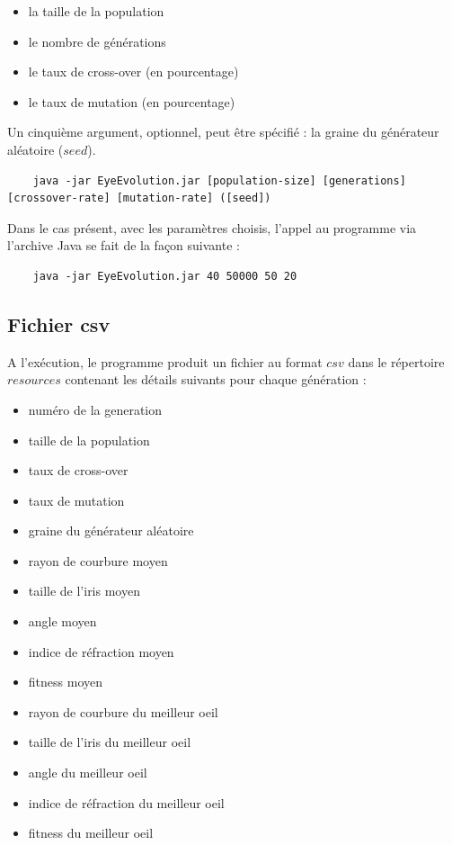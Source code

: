 \documentclass[a4paper,11pt]{article}
\begin{document}
\begin{itemize}
\item la taille de la population
\item le nombre de générations
\item le taux de cross-over (en pourcentage)
\item le taux de mutation (en pourcentage)
\end{itemize}

Un cinquième argument, optionnel, peut être spécifié : la graine du générateur aléatoire ($seed$).

\begin{lstlisting}
	java -jar EyeEvolution.jar [population-size] [generations] [crossover-rate] [mutation-rate] ([seed])
\end{lstlisting}

Dans le cas présent, avec les paramètres choisis, l'appel au programme via l'archive Java se fait de la façon suivante : 

\begin{lstlisting}
	java -jar EyeEvolution.jar 40 50000 50 20
\end{lstlisting}
	
\subsection{Fichier csv}

A l'exécution, le programme produit un fichier au format $csv$ dans le répertoire $resources$ contenant les détails suivants pour chaque génération :
\begin{itemize}
\item numéro de la generation
\item taille de la population
\item taux de cross-over
\item taux de mutation
\item graine du générateur aléatoire
\item rayon de courbure moyen
\item taille de l'iris moyen
\item angle moyen
\item indice de réfraction moyen
\item fitness moyen
\item rayon de courbure du meilleur oeil
\item taille de l'iris du meilleur oeil
\item angle du meilleur oeil
\item indice de réfraction du meilleur oeil
\item fitness du meilleur oeil
\end{itemize}
\end{document}
